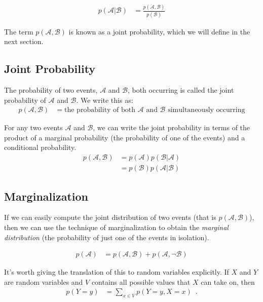 \documentclass{tufte-handout}
\begin{document}
\begin{align}
p(\mathcal{A}|\mathcal{B}) &= \frac{p(\mathcal{A}, \mathcal{B})}{p(\mathcal{B})}
\end{align}

The term $p(\mathcal{A}, \mathcal{B})$ is known as a joint probability, which we will define in the next section.

\subsection{Joint Probability}
The probability of two events, $\mathcal{A}$ and $\mathcal{B}$, both occurring is called the joint probability of $\mathcal{A}$ and $\mathcal{B}$.  We write this as:
\begin{align}
p(\mathcal{A}, \mathcal{B}) &= \mbox{the probability of both $\mathcal{A}$ and $\mathcal{B}$ simultaneously occurring}
\end{align}

For any two events $\mathcal{A}$ and $\mathcal{B}$, we can write the joint probability in terms of the product of a marginal probability (the probability of one of the events) and a conditional probability.
\begin{align}
p(\mathcal{A}, \mathcal{B}) &= p(\mathcal{A}) p( \mathcal{B} | \mathcal{A})  \\
&= p(\mathcal{B}) p( \mathcal{A} | \mathcal{B})
\end{align}


\subsection{Marginalization}
If we can easily compute the joint distribution of two events (that is $p(\mathcal{A}, \mathcal{B})$), then we can use the technique of marginalization to obtain the \emph{marginal distribution} (the probability of just one of the events in isolation).

\begin{align}
p(\mathcal{A}) &= p(\mathcal{A}, \mathcal{B}) + p(\mathcal{A}, \neg \mathcal{B})
\end{align}

It's worth giving the translation of this to random variables explicitly.  If $X$ and $Y$ are random variables and $V$ contains all possible values that $X$ can take on, then
\begin{align}
p(Y=y) &= \sum_{x \in V} p(Y=y, X=x) \enspace .
\end{align}
\end{document}
